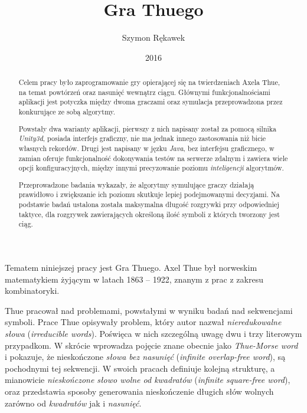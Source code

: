 \documentclass[document]{xmgr}
\author   {Szymon Rękawek}
\title    {Gra Thuego}
\date     {2016}
\begin{document}
\begin{abstract}
Celem pracy było zaprogramowanie gry opierającej się na twierdzeniach Axela Thue, na temat powtórzeń oraz nasunięć wewnątrz ciągu. Głównymi funkcjonalnościami aplikacji jest potyczka między dwoma graczami oraz symulacja przeprowadzona przez konkurujące ze sobą algorytmy. 

Powstały dwa warianty aplikacji, pierwszy z nich napisany został za pomocą silnika \emph{Unity3d}, posiada interfejs graficzny, nie ma jednak innego zastosowania niż bicie własnych rekordów. Drugi jest napisany w jęzku \emph{Java}, bez interfejsu graficznego, w zamian oferuje funkcjonalność dokonywania testów na serwerze zdalnym i zawiera wiele opcji konfiguracyjnych, między innymi precyzowanie poziomu \emph{inteligencji} algorytmów. 

Przeprowadzone badania wykazały, że algorytmy symulujące graczy działają prawidłowo i zwiększanie ich poziomu skutkuje lepiej podejmowanymi decyzjami. Na podstawie badań ustalona została maksymalna długość rozgrywki przy odpowiedniej taktyce, dla rozgrywek zawierających określoną ilość symboli z których tworzony jest ciąg.
\end{abstract}


\maketitle

\introduction

Tematem niniejszej pracy jest Gra Thuego. Axel Thue był norweskim matematykiem żyjącym w latach 1863 -- 1922, znanym z prac z zakresu kombinatoryki.

Thue pracował nad problemami, powstałymi w wyniku badań nad sekwencjami symboli. Prace Thue \cite{repetition} opisywały problem, który autor nazwał \emph{nieredukowalne słowa} (\emph{irreducible words}). Poświęca w nich szczególną uwagę dwu i trzy literowym przypadkom. W skrócie wprowadza pojęcie znane obecnie jako \emph{Thue-Morse word} i pokazuje, że nieskończone \emph{słowa bez nasunięć} (\emph{infinite overlap-free word}), są pochodnymi tej sekwencji. W swoich pracach definiuje kolejną strukturę, a mianowicie \emph{nieskończone słowo wolne od kwadratów}  (\emph{infinite square-free word}), oraz przedstawia sposoby generowania nieskończenie długich słów wolnych zarówno od \emph{kwadratów} jak i \emph{nasunięć}.
\end{document}
